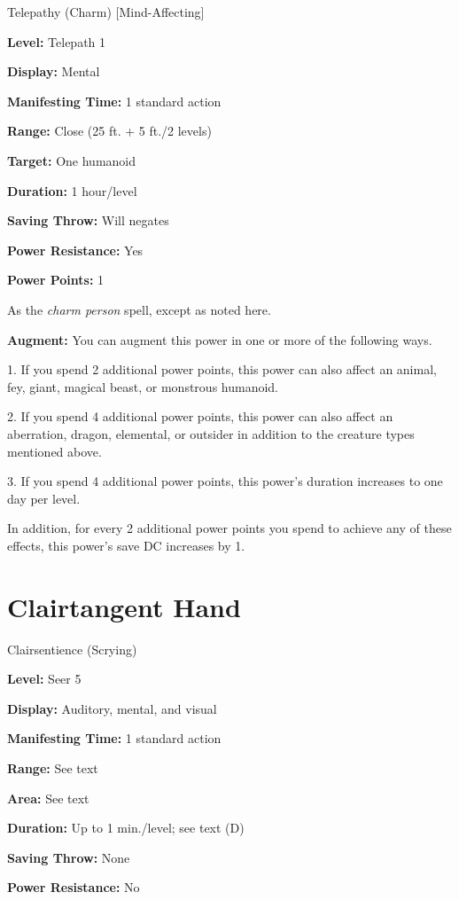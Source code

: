 \documentclass{article}
\begin{document}
Telepathy (Charm) [Mind-Affecting]

\textbf{Level:} Telepath 1

\textbf{Display:} Mental

\textbf{Manifesting Time:} 1 standard action

\textbf{Range:} Close (25 ft. + 5 ft./2 levels)

\textbf{Target:} One humanoid

\textbf{Duration:} 1 hour/level

\textbf{Saving Throw:} Will negates

\textbf{Power Resistance:} Yes

\textbf{Power Points:} 1

As the \textit{charm person }spell, except as noted here.

\textbf{Augment:} You can augment this power in one or more of the following ways.

1. If you spend 2 additional power points, this power can also affect an animal, 
fey, giant, magical beast, or monstrous humanoid.

2. If you spend 4 additional power points, this power can also affect an aberration, 
dragon, elemental, or outsider in addition to the creature types mentioned above.

3. If you spend 4 additional power points, this power's duration increases to one 
day per level.

In addition, for every 2 additional power points you spend to achieve any of these 
effects, this power's save DC increases by 1.

\vspace{12pt}
\section*{Clairtangent Hand}

Clairsentience (Scrying)

\textbf{Level:} Seer 5

\textbf{Display:} Auditory, mental, and visual

\textbf{Manifesting Time:} 1 standard action

\textbf{Range:} See text

\textbf{Area:} See text

\textbf{Duration:} Up to 1 min./level; see text (D)

\textbf{Saving Throw:} None

\textbf{Power Resistance:} No
\end{document}
